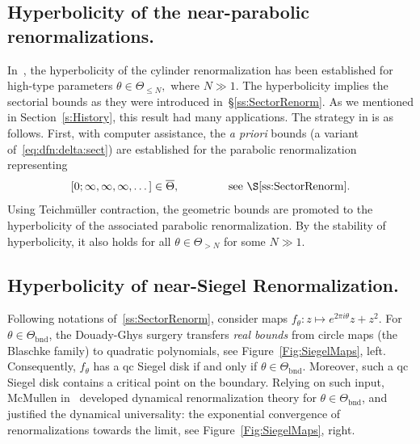 \documentclass[twoside,leqno]{article}
\theoremstyle{plain}
\newcommand{\bnd}{{\mathrm{bnd}}}
\newcommand{\ovlTheta}{{\overline \Theta}}
\begin{document}
\subsection{Hyperbolicity of the near-parabolic renormalizations.} \label{ss:NearParab} In~\cite{IS}, the hyperbolicity of the cylinder renormalization has been established for high-type parameters $\theta\in \Theta_{\le N},$ where $ N\gg 1$. The hyperbolicity implies the sectorial bounds as they were introduced in~\S\ref{ss:SectorRenorm}.  As we mentioned in Section~\ref{s:History}, this result had many applications. The strategy in \cite{IS} is as follows. First, with computer assistance, the \emph{a priori} bounds (a variant of~\eqref{eq:dfn:delta:sect}) are established for the parabolic renormalization representing 
\[  [0;\infty, \infty,\infty,\dots]\in \ovlTheta,\qquad \qquad \text{ see \S\ref{ss:SectorRenorm}.}\]
Using Teichm\"uller contraction, the geometric bounds are promoted to the hyperbolicity of the associated parabolic renormalization. By the stability of hyperbolicity, it also holds for all $\theta\in\Theta_{> N}$ for some $N\gg 1$.



\subsection{Hyperbolicity of near-Siegel Renormalization.} \label{ss:NearSiegel} Following notations of~\ref{ss:SectorRenorm}, consider maps $f_\theta \colon z\mapsto e^{2\pi i \theta}z +z^2$. For $\theta\in\Theta_\bnd$, the Douady-Ghys surgery transfers \emph{real bounds} from circle maps (the Blaschke family) to quadratic polynomials, see Figure~\ref{Fig:SiegelMaps}, left. Consequently, $f_\theta$ has a qc Siegel disk if and only if $\theta\in\Theta_\bnd$. Moreover, such a qc Siegel disk contains a critical point on the boundary. Relying on such input,  McMullen in~\cite{McMSiegel} developed dynamical renormalization theory for $\theta\in \Theta_\bnd$, and justified the dynamical universality: the exponential convergence of renormalizations towards the limit, see Figure~\ref{Fig:SiegelMaps}, right.
\end{document}
